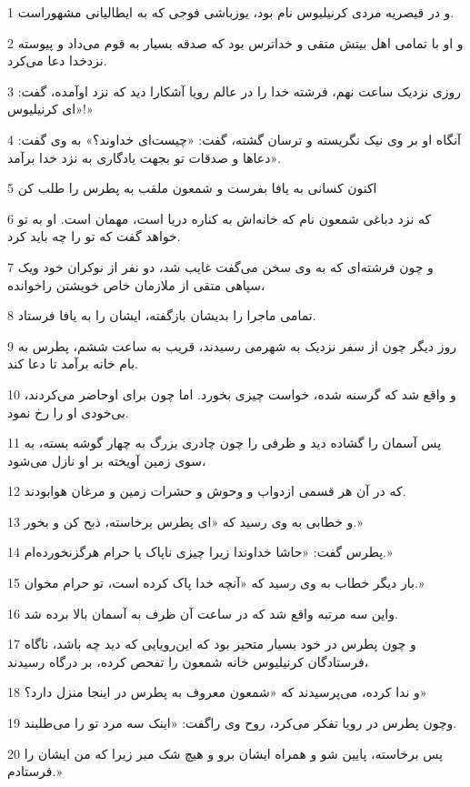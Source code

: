 \par 1 و در قیصریه مردی کرنیلیوس نام بود، یوزباشی فوجی که به ایطالیانی مشهوراست.
\par 2 و او با تمامی اهل بیتش متقی و خداترس بود که صدقه بسیار به قوم می‌داد و پیوسته نزدخدا دعا می‌کرد.
\par 3 روزی نزدیک ساعت نهم، فرشته خدا را در عالم رویا آشکارا دید که نزد اوآمده، گفت: «ای کرنیلیوس!»
\par 4 آنگاه او بر وی نیک نگریسته و ترسان گشته، گفت: «چیست‌ای خداوند؟» به وی گفت: «دعاها و صدقات تو بجهت یادگاری به نزد خدا برآمد.
\par 5 اکنون کسانی به یافا بفرست و شمعون ملقب به پطرس را طلب کن
\par 6 که نزد دباغی شمعون نام که خانه‌اش به کناره دریا است، مهمان است. او به تو خواهد گفت که تو را چه باید کرد.
\par 7 و چون فرشته‌ای که به وی سخن می‌گفت غایب شد، دو نفر از نوکران خود ویک سپاهی متقی از ملازمان خاص خویشتن راخوانده،
\par 8 تمامی ماجرا را بدیشان باز‌گفته، ایشان را به یافا فرستاد.
\par 9 روز دیگر چون از سفر نزدیک به شهرمی رسیدند، قریب به ساعت ششم، پطرس به بام خانه برآمد تا دعا کند.
\par 10 و واقع شد که گرسنه شده، خواست چیزی بخورد. اما چون برای اوحاضر می‌کردند، بی‌خودی او را رخ نمود.
\par 11 پس آسمان را گشاده دید و ظرفی را چون چادری بزرگ به چهار گوشه بسته، به سوی زمین آویخته بر او نازل می‌شود،
\par 12 که در آن هر قسمی ازدواب و وحوش و حشرات زمین و مرغان هوابودند.
\par 13 و خطابی به وی رسید که «ای پطرس برخاسته، ذبح کن و بخور.»
\par 14 پطرس گفت: «حاشا خداوندا زیرا چیزی ناپاک یا حرام هرگزنخورده‌ام.»
\par 15 بار دیگر خطاب به وی رسید که «آنچه خدا پاک کرده است، تو حرام مخوان.»
\par 16 واین سه مرتبه واقع شد که در ساعت آن ظرف به آسمان بالا برده شد.
\par 17 و چون پطرس در خود بسیار متحیر بود که این‌رویایی که دید چه باشد، ناگاه فرستادگان کرنیلیوس خانه شمعون را تفحص کرده، بر درگاه رسیدند،
\par 18 و ندا کرده، می‌پرسیدند که «شمعون معروف به پطرس در اینجا منزل دارد؟»
\par 19 وچون پطرس در رویا تفکر می‌کرد، روح وی راگفت: «اینک سه مرد تو را می‌طلبند.
\par 20 پس برخاسته، پایین شو و همراه ایشان برو و هیچ شک مبر زیرا که من ایشان را فرستادم.»
